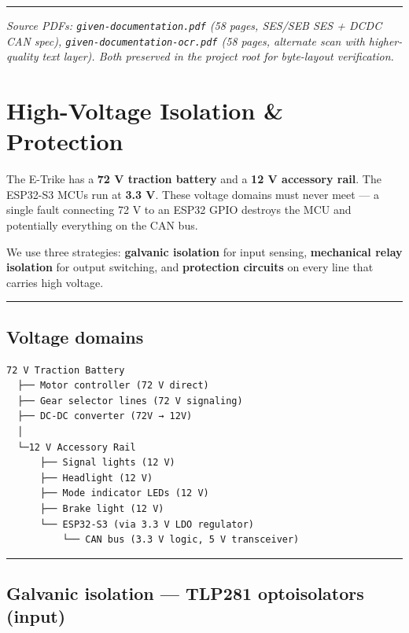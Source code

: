 \documentclass[12pt,a4paper,oneside]{report}
\begin{document}
\begin{center}\rule{0.5\linewidth}{0.5pt}\end{center}

\emph{Source PDFs: \texttt{given-documentation.pdf} (58 pages, SES/SEB SES +
DCDC CAN spec), \texttt{given-documentation-ocr.pdf} (58 pages, alternate scan
with higher-quality text layer). Both preserved in the project root for
byte-layout verification.}


\chapter{High-Voltage Isolation \&
Protection}\label{high-voltage-isolation-protection}

The E-Trike has a \textbf{72 V traction battery} and a \textbf{12 V accessory
rail}. The ESP32-S3 MCUs run at \textbf{3.3 V}. These voltage domains must never
meet --- a single fault connecting 72 V to an ESP32 GPIO destroys the MCU and
potentially everything on the CAN bus.

We use three strategies: \textbf{galvanic isolation} for input sensing,
\textbf{mechanical relay isolation} for output switching, and \textbf{protection
circuits} on every line that carries high voltage.

\begin{center}\rule{0.5\linewidth}{0.5pt}\end{center}

\section{Voltage domains}\label{voltage-domains}

\begin{verbatim}
72 V Traction Battery
  ├── Motor controller (72 V direct)
  ├── Gear selector lines (72 V signaling)
  ├── DC-DC converter (72V → 12V)
  │
  └─12 V Accessory Rail
      ├── Signal lights (12 V)
      ├── Headlight (12 V)
      ├── Mode indicator LEDs (12 V)
      ├── Brake light (12 V)
      └── ESP32-S3 (via 3.3 V LDO regulator)
          └── CAN bus (3.3 V logic, 5 V transceiver)
\end{verbatim}

\begin{center}\rule{0.5\linewidth}{0.5pt}\end{center}

\section{Galvanic isolation --- TLP281 optoisolators
(input)}\label{galvanic-isolation-tlp281-optoisolators-input}
\end{document}
